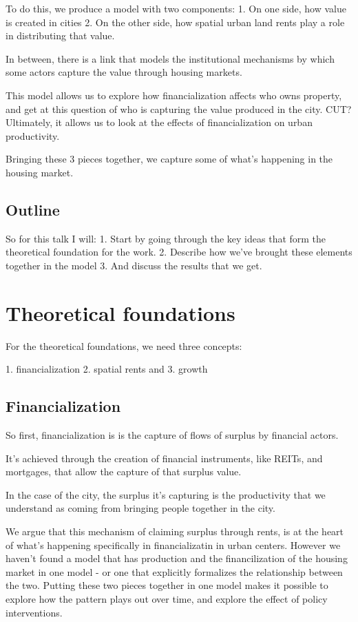 \documentclass[]{article}
\begin{document}
To do this,  we produce a model with two components:
 1. On one side, how value is created in cities 
 2. On the other side, how spatial urban land rents play a role in distributing that value. 

In between, there is a link that models the institutional mechanisms by which some actors capture the value through housing markets.

This model allows us to explore how financialization affects who owns property, and get at this question of who is capturing the value produced in the city. CUT? Ultimately, it allows us to look at the effects of financialization on urban productivity.  

Bringing these 3 pieces together, we capture some of what's happening in the housing market.

\subsection{Outline}
So for this talk I will: 
1. Start by going through the key ideas that form the theoretical foundation for the work.
2. Describe how we've brought these elements together in the model 
3. And discuss the results that we get.

\section{Theoretical foundations}
For the theoretical foundations, we need three concepts: 

1. financialization
2. spatial rents and
3. growth

\subsection{Financialization}

So first, financialization is is the capture of flows of surplus by financial actors. 

It's achieved through the creation of financial instruments, like REITs, and mortgages,  that allow the capture of that surplus value.

In the case of the city, the surplus it's capturing is the productivity that we understand as coming from bringing people together in the city. 

We argue that this mechanism of claiming surplus through rents, is at the heart of what's happening specifically in financializatin in urban centers. 
However we haven't found a model that has production and the financilization of the housing market in one model - or one that explicitly formalizes the relationship between the two. 
Putting these two pieces together in one model makes it possible to explore how the pattern plays out over time, and explore the effect of policy interventions. 
\end{document}
